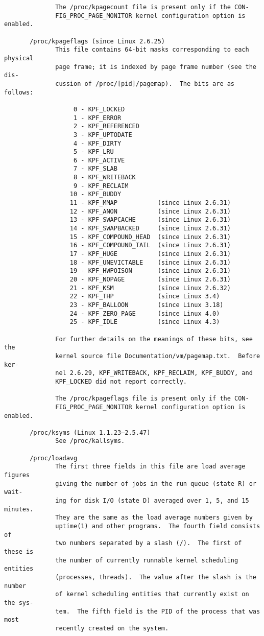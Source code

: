\documentclass[]{article}
\begin{document}
\begin{verbatim}
              The /proc/kpagecount file is present only if the CON‐
              FIG_PROC_PAGE_MONITOR kernel configuration option is enabled.

       /proc/kpageflags (since Linux 2.6.25)
              This file contains 64-bit masks corresponding to each physical
              page frame; it is indexed by page frame number (see the dis‐
              cussion of /proc/[pid]/pagemap).  The bits are as follows:

                   0 - KPF_LOCKED
                   1 - KPF_ERROR
                   2 - KPF_REFERENCED
                   3 - KPF_UPTODATE
                   4 - KPF_DIRTY
                   5 - KPF_LRU
                   6 - KPF_ACTIVE
                   7 - KPF_SLAB
                   8 - KPF_WRITEBACK
                   9 - KPF_RECLAIM
                  10 - KPF_BUDDY
                  11 - KPF_MMAP           (since Linux 2.6.31)
                  12 - KPF_ANON           (since Linux 2.6.31)
                  13 - KPF_SWAPCACHE      (since Linux 2.6.31)
                  14 - KPF_SWAPBACKED     (since Linux 2.6.31)
                  15 - KPF_COMPOUND_HEAD  (since Linux 2.6.31)
                  16 - KPF_COMPOUND_TAIL  (since Linux 2.6.31)
                  17 - KPF_HUGE           (since Linux 2.6.31)
                  18 - KPF_UNEVICTABLE    (since Linux 2.6.31)
                  19 - KPF_HWPOISON       (since Linux 2.6.31)
                  20 - KPF_NOPAGE         (since Linux 2.6.31)
                  21 - KPF_KSM            (since Linux 2.6.32)
                  22 - KPF_THP            (since Linux 3.4)
                  23 - KPF_BALLOON        (since Linux 3.18)
                  24 - KPF_ZERO_PAGE      (since Linux 4.0)
                  25 - KPF_IDLE           (since Linux 4.3)

              For further details on the meanings of these bits, see the
              kernel source file Documentation/vm/pagemap.txt.  Before ker‐
              nel 2.6.29, KPF_WRITEBACK, KPF_RECLAIM, KPF_BUDDY, and
              KPF_LOCKED did not report correctly.

              The /proc/kpageflags file is present only if the CON‐
              FIG_PROC_PAGE_MONITOR kernel configuration option is enabled.

       /proc/ksyms (Linux 1.1.23–2.5.47)
              See /proc/kallsyms.

       /proc/loadavg
              The first three fields in this file are load average figures
              giving the number of jobs in the run queue (state R) or wait‐
              ing for disk I/O (state D) averaged over 1, 5, and 15 minutes.
              They are the same as the load average numbers given by
              uptime(1) and other programs.  The fourth field consists of
              two numbers separated by a slash (/).  The first of these is
              the number of currently runnable kernel scheduling entities
              (processes, threads).  The value after the slash is the number
              of kernel scheduling entities that currently exist on the sys‐
              tem.  The fifth field is the PID of the process that was most
              recently created on the system.


\end{verbatim}
\end{document}
